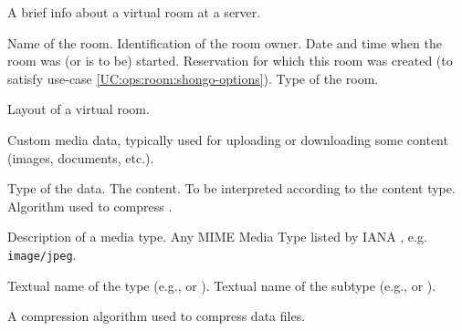 \begin{Api}
A brief info about a virtual room at a server.
\begin{ApiClassAttributes}
 Name of the room.
 Identification of the room owner.
 Date and time when the room was (or is to be) started.
 Reservation for which this room was created (to satisfy use-case \ref{UC:ops:room:shongo-options}).
 Type of the room.
\end{ApiClassAttributes}

Layout of a virtual room.
\begin{ApiEnumValues}
\end{ApiEnumValues}

Custom media data, typically used for uploading or downloading some content (images, documents, etc.).
\begin{ApiClassAttributes}
 Type of the data.
 The content. To be interpreted according to the content type.
 Algorithm used to compress .
\end{ApiClassAttributes}

Description of a media type. Any MIME Media Type listed by IANA \cite{IANA-MediaTypes}, e.g. \texttt{image/jpeg}.
\begin{ApiClassAttributes}
 Textual name of the type (e.g.,  or ).
 Textual name of the subtype (e.g.,  or ).
\end{ApiClassAttributes}

A compression algorithm used to compress data files.
\begin{ApiEnumValues}
\end{ApiEnumValues}


\end{Api}


